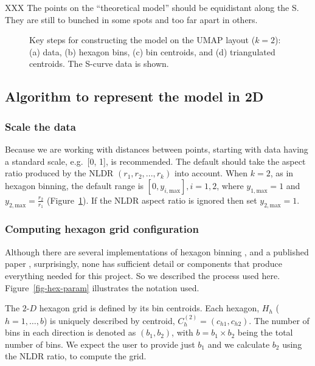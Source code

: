 \documentclass[
  12pt]{article}
\newcommand\gD{$2\text{-}D$}
\begin{document}
XXX The points on the ``theoretical model'' should be equidistant along
the S. They are still to bunched in some spots and too far apart in
others.

\begin{figure}


\caption{\label{fig-NLDR-scurve}Key steps for constructing the model on
the UMAP layout (\(k=2\)): (a) data, (b) hexagon bins, (c) bin
centroids, and (d) triangulated centroids. The S-curve data is shown.}

\end{figure}%

\subsection{Algorithm to represent the model in
2D}\label{algorithm-to-represent-the-model-in-2d}

\subsubsection{Scale the data}\label{scale-the-data}

Because we are working with distances between points, starting with data
having a standard scale, e.g.~{[}0, 1{]}, is recommended. The default
should take the aspect ratio produced by the NLDR
\((r_1, r_2, ..., r_k)\) into account. When \(k=2\), as in hexagon
binning, the default range is \([0, y_{i,\text{max}}], i=1,2\), where
\(y_{1,\text{max}}=1\) and \(y_{2,\text{max}} = \frac{r_2}{r_1}\)
(Figure~\ref{fig-NLDR-scurve}). If the NLDR aspect ratio is ignored then
set \(y_ {2,\text{max}} = 1\).

\subsubsection{Computing hexagon grid
configuration}\label{computing-hexagon-grid-configuration}

Although there are several implementations of hexagon binning
\citep{carr1987}, and a published paper \citep{dan2023}, surprisingly,
none has sufficient detail or components that produce everything needed
for this project. So we described the process used here.
Figure~\ref{fig-hex-param} illustrates the notation used.

The \gD{} hexagon grid is defined by its bin centroids. Each hexagon,
\(H_h\) (\(h = 1, \dots, b\)) is uniquely described by centroid,
\(C_{h}^{(2)} = (c_{h1}, c_{h2})\). The number of bins in each direction
is denoted as \((b_1, b_2)\), with \(b = b_1 \times b_2\) being the
total number of bins. We expect the user to provide just \(b_1\) and we
calculate \(b_2\) using the NLDR ratio, to compute the grid.
\end{document}
